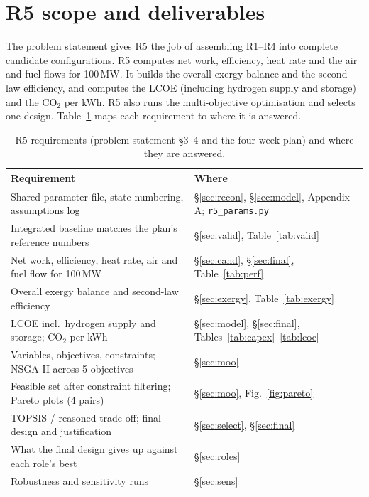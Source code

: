 \documentclass[10.5pt,a4paper]{article}
\begin{document}
\tableofcontents
\newpage

\section{R5 scope and deliverables}
The problem statement gives R5 the job of assembling R1--R4 into complete candidate configurations. R5 computes net work, efficiency, heat rate and the air and fuel flows for 100\,MW. It builds the overall exergy balance and the second-law efficiency, and computes the LCOE (including hydrogen supply and storage) and the CO$_2$ per kWh. R5 also runs the multi-objective optimisation and selects one design. Table~\ref{tab:scope} maps each requirement to where it is answered.

\begin{table}[H]\centering\small\caption{R5 requirements (problem statement \S3--4 and the four-week plan) and where they are answered.}\label{tab:scope}
\begin{tabular}{p{7.6cm}p{6.6cm}}\toprule Requirement & Where \\\midrule
Shared parameter file, state numbering, assumptions log & \S\ref{sec:recon}, \S\ref{sec:model}, Appendix A; \texttt{r5\_params.py}\\
Integrated baseline matches the plan's reference numbers & \S\ref{sec:valid}, Table~\ref{tab:valid}\\
Net work, efficiency, heat rate, air and fuel flow for 100\,MW & \S\ref{sec:cand}, \S\ref{sec:final}, Table~\ref{tab:perf}\\
Overall exergy balance and second-law efficiency & \S\ref{sec:exergy}, Table~\ref{tab:exergy}\\
LCOE incl.\ hydrogen supply and storage; CO$_2$ per kWh & \S\ref{sec:model}, \S\ref{sec:final}, Tables~\ref{tab:capex}--\ref{tab:lcoe}\\
Variables, objectives, constraints; NSGA-II across 5 objectives & \S\ref{sec:moo}\\
Feasible set after constraint filtering; Pareto plots (4 pairs) & \S\ref{sec:moo}, Fig.~\ref{fig:pareto}\\
TOPSIS / reasoned trade-off; final design and justification & \S\ref{sec:select}, \S\ref{sec:final}\\
What the final design gives up against each role's best & \S\ref{sec:roles}\\
Robustness and sensitivity runs & \S\ref{sec:sens}\\\bottomrule
\end{tabular}\end{table}
\end{document}
